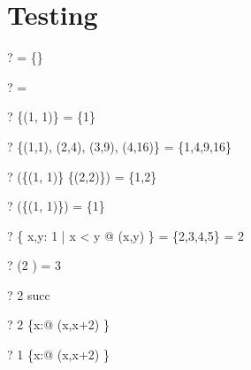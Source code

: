 \documentclass{article}
\begin{document}
\section{Testing \ran}
\begin{zed} \vdash? \ran \emptyset = \{\} \end{zed}
\begin{zed} \vdash? \ran \emptyset = \emptyset \end{zed}
\begin{zed} \vdash? \ran \{(1, 1)\} = \{1\} \end{zed}
\begin{zed} \vdash? \ran \{(1,1), (2,4), (3,9), (4,16)\} = \{1,4,9,16\} \end{zed}
\begin{zed} \vdash? \ran (\{(1, 1)\} \cup \{(2,2)\}) = \{1,2\} \end{zed}
\begin{zed} \vdash? \ran (\emptyset \cup \{(1, 1)\}) = \{1\} \end{zed}
\begin{zed} \vdash? \ran \{ x,y: 1  | x < y @ (x,y) \} = \{2,3,4,5\} = 2  \end{zed}
\begin{zed} \vdash? \ran (2   ) = 3  \end{zed}
\begin{zed} \vdash? 2 \in \ran succ \end{zed}
\begin{zed} \vdash? 2 \in \ran \{x:\nat @ (x,x+2) \} \end{zed}
\begin{zed} \vdash? 1 \notin \ran \{x:\nat @ (x,x+2) \} \end{zed}
\end{document}
